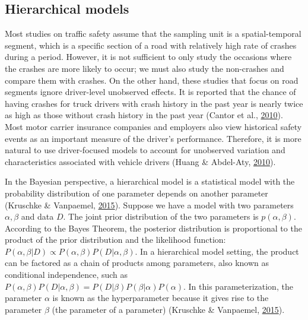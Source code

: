 \documentclass[12pt]{book}
\numberwithin{equation}{chapter}
\begin{document}
\hypertarget{hierarchical-models}{%
\subsection{Hierarchical models}\label{hierarchical-models}}

Most studies on traffic safety assume that the sampling unit is a spatial-temporal segment, which is a specific section of a road with relatively high rate of crashes during a period. However, it is not sufficient to only study the occasions where the crashes are more likely to occur; we must also study the non-crashes and compare them with crashes. On the other hand, these studies that focus on road segments ignore driver-level unobserved effects. It is reported that the chance of having crashes for truck drivers with crash history in the past year is nearly twice as high as those without crash history in the past year (Cantor et al., \protect\hyperlink{ref-cantor2010driver}{2010}). Most motor carrier insurance companies and employers also view historical safety events as an important measure of the driver's performance. Therefore, it is more natural to use driver-focused models to account for unobserved variation and characteristics associated with vehicle drivers (Huang \& Abdel-Aty, \protect\hyperlink{ref-huang2010multilevel}{2010}).

In the Bayesian perspective, a hierarchical model is a statistical model with the probability distribution of one parameter depends on another parameter (Kruschke \& Vanpaemel, \protect\hyperlink{ref-kruschke2015bayesian}{2015}). Suppose we have a model with two parameters \(\alpha, \beta\) and data \(D\). The joint prior distribution of the two parameters is \(p(\alpha, \beta)\). According to the Bayes Theorem, the posterior distribution is proportional to the product of the prior distribution and the likelihood function: \(P(\alpha, \beta|D) \propto P(\alpha, \beta)P(D|\alpha,\beta)\). In a hierarchical model setting, the product can be factored as a chain of products among parameters, also known as conditional independence, such as \(P(\alpha, \beta)P(D|\alpha,\beta) = P(D|\beta)P(\beta|\alpha)P(\alpha)\). In this parameterization, the parameter \(\alpha\) is known as the hyperparameter because it gives rise to the parameter \(\beta\) (the parameter of a parameter) (Kruschke \& Vanpaemel, \protect\hyperlink{ref-kruschke2015bayesian}{2015}).
\end{document}
